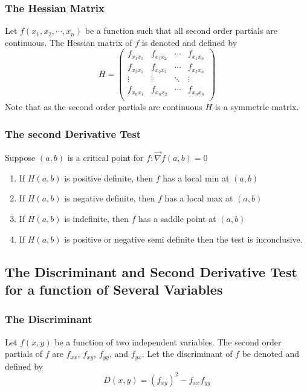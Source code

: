 \documentclass[14pt]{article}
\begin{document}
    \subsubsection{The Hessian Matrix}
    Let $f(x_1, x_2, \cdots, x_n)$ be a function such that all second
    order partials are continuous. The Hessian matrix of $f$ is denoted
    and defined by
    $$H=\begin{pmatrix} f_{x_1x_1} & f_{x_1x_2}& \cdots &f_{x_1x_n}\\
        f_{x_2x_1}& f_{x_2x_2}&\cdots&f_{x_2x_n}\\
        \vdots&\vdots&\ddots&\vdots\\
        f_{x_nx_1}&f_{x_nx_2}&\cdots&f_{x_nx_n}\\
    \end{pmatrix}$$ Note that as the second order partials are
    continuous $H$ is a symmetric matrix.
    \subsubsection{The second Derivative Test}
    Suppose $(a,b)$ is a critical point for $f:\vec\nabla f(a,b)=0$
    \begin{enumerate}
        \item If $H(a,b)$ is positive definite, then $f$ has a local min
        at $(a,b)$
        \item If $H(a,b)$ is negative definite, then $f$ has a local max
        at $(a,b)$
        \item If $H(a,b)$ is indefinite, then $f$ has a saddle point at
        $(a,b)$
        \item If $H(a,b)$ is positive or negative semi definite then the
        test is inconclusive.
    \end{enumerate}
    
    \subsection{The Discriminant and Second Derivative Test for a function of Several Variables}
    \subsubsection{The Discriminant}
    Let $f(x,y)$ be a function of two independent variables. The second
    order partials of $f$ are $f_{xx}$, $f_{xy}$, $f_{yy}$, and
    $f_{yx}$. Let the discriminant of $f$ be denoted and defined by
    $$D(x,y)=(f_{xy})^2-f_{xx}f_{yy}$$
\end{document}
